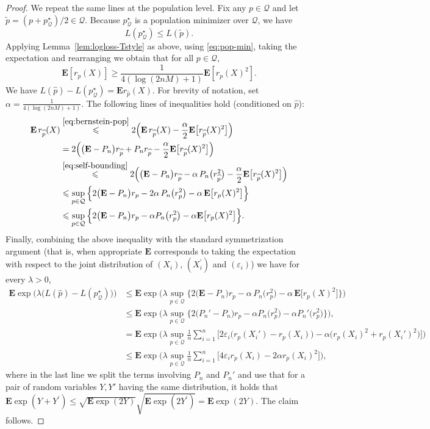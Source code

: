 \documentclass[11pt]{article}
\newcommand{\E}{{\mathbf E}}
\renewcommand{\le}{\leqslant}
\renewcommand{\ge}{\geqslant}
\newcommand{\Qs}{\mathcal{Q}}
\renewcommand{\tilde}{\widetilde}
\theoremstyle{definition}
\theoremstyle{remark}
\begin{document}
\begin{proof}
We repeat the same lines at the population level.
Fix any $p\in\Qs$ and let $\tilde p = (p+p^\star_{\Qs})/2\in\Qs$.
Because $p^\star_{\Qs}$ is a population minimizer over $\Qs$, we have
\begin{equation}\label{eq:pop-min}
L(p^\star_{\Qs}) \le L(\tilde p).
\end{equation}
Applying Lemma~\ref{lem:logloss-Tstyle} as above, using \eqref{eq:pop-min}, taking the expectation and rearranging we obtain that for all $p \in \Qs$,
\begin{equation}\label{eq:bernstein-pop}
\E[r_p(X)] \ge \frac{1}{4(\log(2nM)+1)}\E[r_p(X)^2].
\end{equation}
We have $L(\widehat p)-L(p^\star_{\Qs})
= \E r_{\widehat p}(X)$. For brevity of notation, set
$
\alpha = \frac{1}{4(\log(2nM)+1)}.
$
The following lines of inequalities hold (conditioned on $\widehat{p}$):
\begin{align*}
\E\, r_{\widehat p}(X)
&\stackrel{\eqref{eq:bernstein-pop}}{\le}
2\Big(\E\, r_{\widehat p}(X)-\frac{\alpha}{2}\E\big[r_{\widehat p}(X)^2\big]\Big)\\
&=
2\Big(\big(\E-P_n\big) r_{\widehat p}+P_n r_{\widehat p}-\frac{\alpha}{2}\E\big[r_{\widehat p}(X)^2\big]\Big)\\
&\stackrel{\eqref{eq:self-bounding}}{\le}
2\Big(\big(\E-P_n\big) r_{\widehat p}-\alpha\,P_n\big(r_{\widehat p}^2\big)-\frac{\alpha}{2}\E\big[r_{\widehat p}(X)^2\big]\Big)\\
&\le
\sup_{p\in\Qs}\Big\{2\big(\E-P_n\big) r_{p}-2\alpha\,P_n\big(r_{p}^2\big)-\alpha\,\E\big[r_{p}(X)^2\big]\Big\}\\
&\le
\sup_{p\in\Qs}\Big\{2\big(\E-P_n\big) r_{p}-\alpha P_n\big(r_{p}^2\big)-\alpha\E\big[r_{p}(X)^2\big]\Big\}.
\end{align*}
Finally, combining the above inequality with the standard symmetrization argument (that is, when appropriate $\E$ corresponds to taking the expectation with respect to the joint distribution of $(X_i)$, $(X_i^\prime)$ and $(\varepsilon_i)$) we have for every $\lambda>0$,
\begin{align*}
\E\exp\Big(\lambda\big(L(\widehat p)-L(p^\star_{\Qs})\big)\Big)
&\le \E\exp\big(\lambda\sup_{p\in\Qs}\Big\{2\big(\E-P_n\big) r_{p}-\alpha\,P_n\big(r_{p}^2\big)-\alpha\,\E\big[r_{p}(X)^2\big]\Big\}\big)
\\&\le \E\exp\big(\lambda\sup_{p\in\Qs}\Big\{2\big(P_n'-P_n\big) r_{p}-{\alpha}P_n\big(r_{p}^2\big)-{\alpha}P_n'\big(r_{p}^2\big)\Big\}\big),
\\
&=\E\exp\Big(
\lambda\sup_{p\in\Qs}
\frac1n\sum_{i=1}^n
\Big[
 2\varepsilon_i\big(r_p(X_i')-r_p(X_i)\big)
 -\alpha\big(r_p(X_i)^2+r_p(X_i')^2\big)
\Big]
\Big)
\\
&\le\E\exp\Big(
\lambda\sup_{p\in\Qs}
\frac1n\sum_{i=1}^n
\Big[
 4\varepsilon_i r_p(X_i)
 -2\alpha r_p(X_i)^2
\Big]
\Big),
\end{align*}
where in the last line we split the terms involving $P_n$ and $P_n\prime$ and use that for a pair of random variables $Y, Y'$ having the same distribution, it holds that $\E\exp(Y + Y^\prime) \le \sqrt{\E\exp(2Y)}\sqrt{\E\exp(2Y^\prime)} = \E\exp(2Y)$. The claim follows.
\end{proof}
\end{document}
